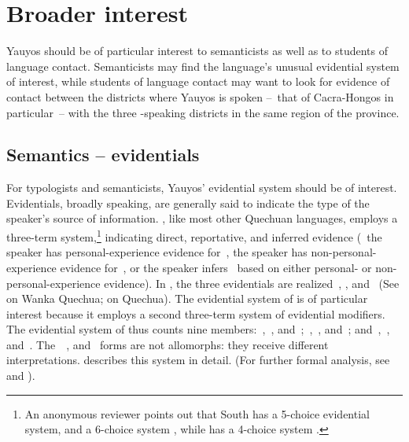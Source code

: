 \section{Broader interest}\label{sec:brin}
Yauyos should be of particular interest to semanticists as well as to students of language contact. Semanticists may find the language’s unusual evidential system of interest, while students of language contact may want to look for evidence of contact between the districts where Yauyos is spoken --~that of Cacra-Hongos in particular~-- with the three -speaking districts in the same region of the province.

\subsection{Semantics -- evidentials}
For typologists and semanticists, Yauyos’ evidential system should be of interest. Evidentials, broadly speaking, are generally said to indicate the type of the speaker’s source of information. \SYQ, like most other Quechuan languages, employs a three-term system,\footnote{An anonymous reviewer points out that South  has a 5-choice evidential system, and  a 6-choice system \citep{Hintz14}, while  has a 4-choice system \citep{Weber89}.} indicating direct, reportative, and inferred evidence (\ie~the speaker has personal-experience evidence for~, the speaker has non-personal-experience evidence for~, or the speaker infers~ based on either personal- or non-personal-experience evidence). In \SYQ, the three evidentials are realized~, , and~ (See \citet{Floyd99} on Wanka Quechua; \citet{Faller03} on  Quechua). The evidential system of \SYQ{} is of particular interest because it employs a second three-term system of evidential modifiers. The evidential system of \SYQ{} thus counts nine members:~,~, and~;~,~, and~; and~,~, and~. The~~, and~ forms are not allomorphs: they receive different interpretations.  describes this system in detail. (For further formal analysis, see \citealt{Shimelman12} and \citealt{Shimelman14}).

